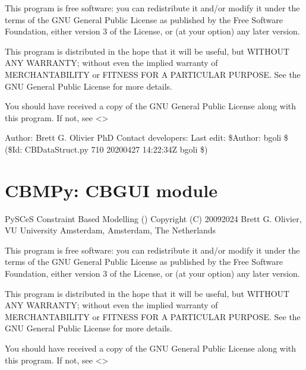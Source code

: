 \documentclass[letterpaper,10pt,english]{sphinxmanual}
\begin{document}
\sphinxAtStartPar
This program is free software: you can redistribute it and/or modify
it under the terms of the GNU General Public License as published by
the Free Software Foundation, either version 3 of the License, or
(at your option) any later version.

\sphinxAtStartPar
This program is distributed in the hope that it will be useful,
but WITHOUT ANY WARRANTY; without even the implied warranty of
MERCHANTABILITY or FITNESS FOR A PARTICULAR PURPOSE.  See the
GNU General Public License for more details.

\sphinxAtStartPar
You should have received a copy of the GNU General Public License
along with this program.  If not, see \textless{}\textgreater{}

\sphinxAtStartPar
Author: Brett G. Olivier PhD
Contact developers: 
Last edit: \$Author: bgoli \$ (\$Id: CBDataStruct.py 710 2020\sphinxhyphen{}04\sphinxhyphen{}27 14:22:34Z bgoli \$)
\label{\detokenize{modules_doc:module-cbmpy.CBGUI}}

\section{CBMPy: CBGUI module}
\label{\detokenize{modules_doc:cbmpy-cbgui-module}}
\sphinxAtStartPar
PySCeS Constraint Based Modelling ()
Copyright (C) 2009\sphinxhyphen{}2024 Brett G. Olivier, VU University Amsterdam, Amsterdam, The Netherlands

\sphinxAtStartPar
This program is free software: you can redistribute it and/or modify
it under the terms of the GNU General Public License as published by
the Free Software Foundation, either version 3 of the License, or
(at your option) any later version.

\sphinxAtStartPar
This program is distributed in the hope that it will be useful,
but WITHOUT ANY WARRANTY; without even the implied warranty of
MERCHANTABILITY or FITNESS FOR A PARTICULAR PURPOSE.  See the
GNU General Public License for more details.

\sphinxAtStartPar
You should have received a copy of the GNU General Public License
along with this program.  If not, see \textless{}\textgreater{}
\end{document}
